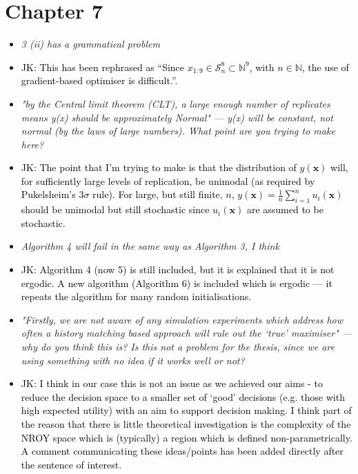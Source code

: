 \documentclass[12pt]{article}
\newcommand{\N}{\mathbb{N}}
\newcommand{\bx}{\bm{x}}
\newcommand{\done}[2]{\item[#1]\textit{#2}}
\newcommand{\jack}[1]{\item{\textcolor{black}{JK: #1}}}
\begin{document}
\newpage
\section{Chapter 7}
\begin{itemize}
\done{P160}{3 (ii) has a grammatical problem}
\jack{This has been rephrased as ``Since $x_{1:9} \in \mathcal{S}^{8}_n \subset \N^{9}$, with $n \in \N$, the use of gradient-based optimiser is difficult.''.}

\done{P165}{"by the Central limit theorem (CLT), a large enough number of replicates means y(x) should be approximately Normal" --- y(x) will be constant, not normal (by the laws of large numbers).  What point are you trying to make here?}

\jack{The point that I'm trying to make is that the distribution of $y(\bx)$ will, for sufficiently large levels of replication, be unimodal (as required by Pukelsheim's $3\sigma$ rule). For large, but still finite, $n$, $y(\bx) = \frac1n \sum_{i=1}^n u_i(\bx)$ should be unimodal but still stochastic since $u_i(\bx)$ are assumed to be stochastic.}

\done{P172}{Algorithm 4 will fail in the same way as Algorithm 3, I think}
\jack{Algorithm 4 (now 5) is still included, but it is explained that it is not ergodic. A new algorithm (Algorithm 6) is included which is ergodic --- it repeats the algorithm for many random initialisations.}

\done{P193}{"Firstly, we are not aware of any simulation experiments which address how often a history matching based approach will rule out the ‘true’ maximiser" --- why do you think this is?  Is this not a problem for the thesis, since we are using something with no idea if it works well or not?}

\jack{I think in our case this is not an issue as we achieved our aims - to reduce the decision space to a smaller set of `good' decisions (e.g. those with high expected utility) with an aim to support decision making. I think part of the reason that there is little theoretical investigation is the complexity of the NROY space which is (typically) a region which is defined non-parametrically. A comment communicating these ideas/points has been added directly after the sentence of interest.}
\end{itemize}

\newpage
\end{document}
